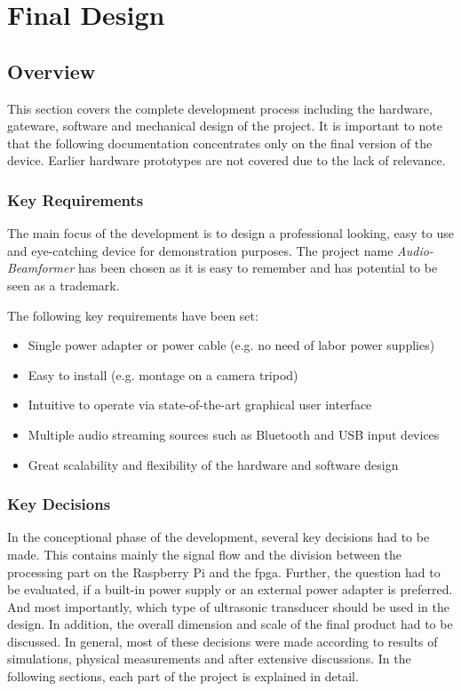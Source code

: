 \chapter{Final Design}
\section{Overview}
This section covers the complete development process including the hardware, gateware, software and mechanical design of the project. It is important to note that the following documentation concentrates only on the final version of the device. Earlier hardware prototypes are not covered due to the lack of relevance.

\subsection{Key Requirements}
The main focus of the development is to design a professional looking, easy to use and eye-catching device for demonstration purposes. The project name \textit{Audio-Beamformer} has been chosen as it is easy to remember and has potential to be seen as a trademark.

The following key requirements have been set:
\begin{itemize}
	\item Single power adapter or power cable (e.g. no need of labor power supplies)
	\item Easy to install (e.g. montage on a camera tripod)
	\item Intuitive to operate via state-of-the-art graphical user interface
	\item Multiple audio streaming sources such as Bluetooth and USB input devices
	\item Great scalability and flexibility of the hardware and software design
\end{itemize}

\subsection{Key Decisions}
In the conceptional phase of the development, several key decisions had to be made. This contains mainly the signal flow and the division between the processing part on the Raspberry Pi and the \acrshort{fpga}. Further, the question had to be evaluated, if a built-in power supply or an external power adapter is preferred. And most importantly, which type of ultrasonic transducer should be used in the design.
In addition, the overall dimension and scale of the final product had to be discussed.
In general, most of these decisions were made according to results of simulations, physical measurements and after extensive discussions.
In the following sections, each part of the project is explained in detail.

